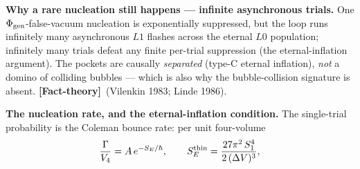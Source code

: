 \documentclass[11pt]{article}
\newcommand{\factth}{\textcolor{green!40!black}{\textbf{[Fact-theory]}}}
\begin{document}
\medskip\noindent\textbf{Why a rare nucleation still happens --- infinite asynchronous trials.} One $\Phi_{\rm gen}$-false-vacuum nucleation is exponentially suppressed, but the loop runs infinitely many asynchronous $L1$ flashes across the eternal $L0$ population; infinitely many trials defeat any finite per-trial suppression (the eternal-inflation argument). The pockets are causally \emph{separated} (type-C eternal inflation), \emph{not} a domino of colliding bubbles --- which is also why the bubble-collision signature is absent. \factth\ (Vilenkin 1983; Linde 1986).

\medskip\noindent\textbf{The nucleation rate, and the eternal-inflation condition.} The single-trial probability is the Coleman bounce rate: per unit four-volume
\[
  \frac{\Gamma}{V_4}=A\,e^{-S_E/\hbar},\qquad
  S_E^{\rm thin}=\frac{27\pi^2\,S_1^{4}}{2\,(\Delta V)^{3}},
\]
\end{document}
